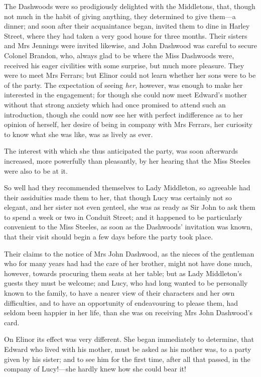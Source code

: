The Dashwoods were so prodigiously delighted with the Middletons, that, though not much in the habit of giving anything, they determined to give them—a dinner; and soon after their acquaintance began, invited them to dine in Harley Street, where they had taken a very good house for three months. Their sisters and Mrs Jennings were invited likewise, and John Dashwood was careful to secure Colonel Brandon, who, always glad to be where the Miss Dashwoods were, received his eager civilities with some surprise, but much more pleasure. They were to meet Mrs Ferrars; but Elinor could not learn whether her sons were to be of the party. The expectation of seeing \textit{her}, however, was enough to make her interested in the engagement; for though she could now meet Edward’s mother without that strong anxiety which had once promised to attend such an introduction, though she could now see her with perfect indifference as to her opinion of herself, her desire of being in company with Mrs Ferrars, her curiosity to know what she was like, was as lively as ever.

The interest with which she thus anticipated the party, was soon afterwards increased, more powerfully than pleasantly, by her hearing that the Miss Steeles were also to be at it.

So well had they recommended themselves to Lady Middleton, so agreeable had their assiduities made them to her, that though Lucy was certainly not so elegant, and her sister not even genteel, she was as ready as Sir John to ask them to spend a week or two in Conduit Street; and it happened to be particularly convenient to the Miss Steeles, as soon as the Dashwoods’ invitation was known, that their visit should begin a few days before the party took place.

Their claims to the notice of Mrs John Dashwood, as the nieces of the gentleman who for many years had had the care of her brother, might not have done much, however, towards procuring them seats at her table; but as Lady Middleton’s guests they must be welcome; and Lucy, who had long wanted to be personally known to the family, to have a nearer view of their characters and her own difficulties, and to have an opportunity of endeavouring to please them, had seldom been happier in her life, than she was on receiving Mrs John Dashwood’s card.

On Elinor its effect was very different. She began immediately to determine, that Edward who lived with his mother, must be asked as his mother was, to a party given by his sister; and to see him for the first time, after all that passed, in the company of Lucy!—she hardly knew how she could bear it!

